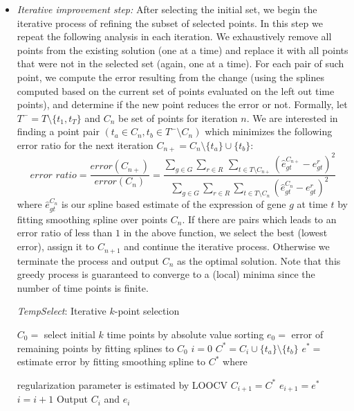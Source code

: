 \documentclass[10pt]{article}
\newcommand{\Tempselect}{\textit{TempSelect}\xspace}
\begin{document}
\begin{itemize}
\item {\em Iterative improvement step:} After selecting the initial set, we begin the iterative process of refining the subset of selected points.
In this step we repeat the following analysis in each iteration. We
exhaustively remove all points from the existing solution (one at a
time) and replace it with all points that were not in the selected
set (again, one at a time). For each pair of such point, we compute
the error resulting from the change (using the splines computed
based on the current set of points evaluated on the left out time
points), and determine if the new point reduces the error or not.
Formally, let $T^{-} = T \setminus \{t_{1}, t_{T}\}$ and $C_n$ be set of points for iteration $n$. We are
interested in finding a point pair $(t_{a} \in C_n, t_{b} \in T^{-}
\setminus C_n)$ which minimizes the following error ratio for the next iteration $C_{n+} =
C_n \setminus \{t_{a}\} \cup \{t_{b}\}$:
%
\begin{equation}
\textit{error ratio} = \frac{error(C_{n+})}{error(C_{n})} = \frac{\sum_{g \in G} \sum_{r \in R}\, \sum_{t \in
    T \setminus C_{n+}} (\hat{e}_{gt}^{C_{n+}} - e_{gt}^{r})^{2}}{\sum_{g \in G}
  \sum_{r \in R} \sum_{t \in
    T \setminus C_{n}} (\hat{e}_{gt}^{C_{n}} - e_{gt}^{r})^{2}}
\end{equation}
%
where $\hat{e}_{gt}^{C_{n}}$ is our spline based estimate of the expression
of gene $g$ at time $t$ by fitting smoothing spline over points
$C_{n}$. If there are pairs which leads to an error ratio
of less than $1$ in the above function, we select the best (lowest
error), assign it to $C_{n+1}$ and continue the iterative process. Otherwise we terminate
the process and output $C_n$ as the optimal solution. Note that this
greedy process is guaranteed to converge to a (local) minima since
the number of time points is finite.


\begin{algorithm}
\caption{\Tempselect: Iterative $k$-point selection}
\label{alg:algo}
\begin{algorithmic}[1]
\State $C_{0} = $ select initial $k$ time points by absolute value sorting
\State $e_{0} = $ error of remaining points by fitting splines to $C_{0}$
\State $i=0$
\Do 
{}
\State $C^{*} = C_{i} \cup \{ t_{a} \} \setminus \{ t_{b}\}$ 
\State $e^{*} = $ estimate error by fitting smoothing spline to
$C^{*}$ where \par 
\hspace{1.62cm} regularization parameter is estimated by LOOCV
\State $C_{i+1} = C^{*}$ 
\State $e_{i+1} = e^{*}$
\EndIf
\State $i = i+1$
\EndFor
{}
\State Output $C_{i}$ and $e_{i}$
\EndProcedure
\end{algorithmic}
\end{algorithm}


\end{itemize}
\end{document}
